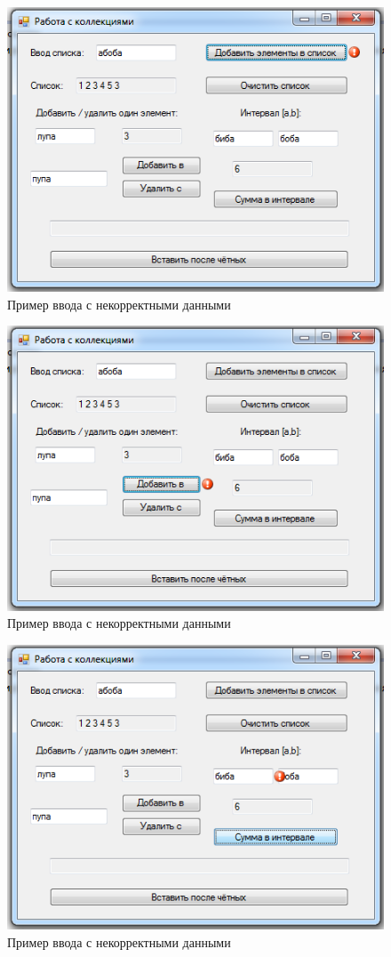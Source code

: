 \begin{figure}
\centering
\includegraphics[width=0.5\linewidth]{images//collections/error.png}
\caption{Пример ввода с некорректными данными}
\label{fig:collections-error}
\end{figure}

\begin{figure}
\centering
\includegraphics[width=0.5\linewidth]{images//collections/error2.png}
\caption{Пример ввода с некорректными данными}
\label{fig:collections-error2}
\end{figure}

\begin{figure}
\centering
\includegraphics[width=0.5\linewidth]{images//collections/error3.png}
\caption{Пример ввода с некорректными данными}
\label{fig:collections-error2}
\end{figure}


